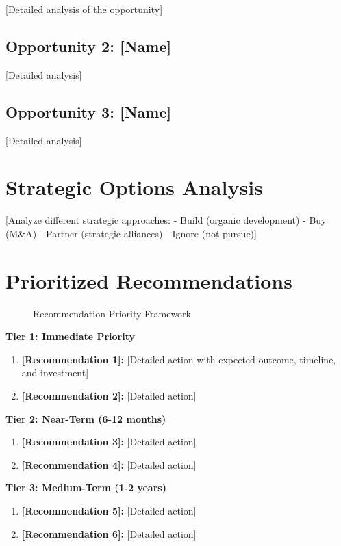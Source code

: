 \documentclass[11pt,letterpaper]{report}
\begin{document}
[Detailed analysis of the opportunity]

\subsection{Opportunity 2: [Name]}
[Detailed analysis]

\subsection{Opportunity 3: [Name]}
[Detailed analysis]

\section{Strategic Options Analysis}

[Analyze different strategic approaches:
- Build (organic development)
- Buy (M\&A)
- Partner (strategic alliances)
- Ignore (not pursue)]

\section{Prioritized Recommendations}


\begin{figure}[htbp]
\centering
\caption{Recommendation Priority Framework}
\label{fig:recommendations}
\end{figure}

\begin{recommendationbox}
\textbf{Tier 1: Immediate Priority}
\begin{enumerate}
    \item \textbf{[Recommendation 1]:} [Detailed action with expected outcome, timeline, and investment]
    \item \textbf{[Recommendation 2]:} [Detailed action]
\end{enumerate}

\textbf{Tier 2: Near-Term (6-12 months)}
\begin{enumerate}[start=3]
    \item \textbf{[Recommendation 3]:} [Detailed action]
    \item \textbf{[Recommendation 4]:} [Detailed action]
\end{enumerate}

\textbf{Tier 3: Medium-Term (1-2 years)}
\begin{enumerate}[start=5]
    \item \textbf{[Recommendation 5]:} [Detailed action]
    \item \textbf{[Recommendation 6]:} [Detailed action]
\end{enumerate}
\end{recommendationbox}
\end{document}
